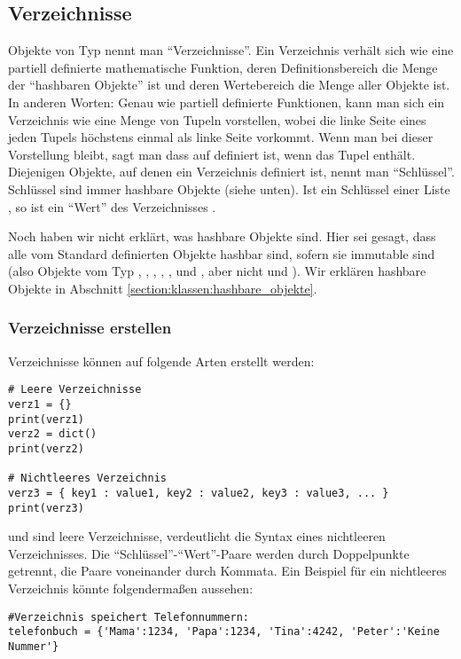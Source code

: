 \subsection{Verzeichnisse}
\label{section:std_data_types:verzeichnisse}
Objekte von Typ  nennt man ``Verzeichnisse''.
Ein Verzeichnis verhält sich wie eine partiell definierte mathematische Funktion,
deren Definitionsbereich die Menge der ``hashbaren Objekte'' ist und deren Wertebereich die Menge aller Objekte ist.
In anderen Worten:
Genau wie partiell definierte Funktionen, kann man sich ein Verzeichnis  wie eine Menge von Tupeln  vorstellen,
wobei die linke Seite eines jeden Tupels höchstens einmal als linke Seite vorkommt.
Wenn man bei dieser Vorstellung bleibt, sagt man dass  auf  definiert ist, wenn  das Tupel  enthält.
Diejenigen Objekte, auf denen ein Verzeichnis definiert ist, nennt man ``Schlüssel''.
Schlüssel sind immer hashbare Objekte (siehe unten).
Ist  ein Schlüssel einer Liste , so ist  ein ``Wert'' des Verzeichnisses .

Noch haben wir nicht erklärt, was hashbare Objekte sind.
Hier sei gesagt, dass alle vom \Python Standard definierten Objekte hashbar sind, sofern sie immutable sind
(also Objekte vom Typ , , , , ,  und ,
aber nicht  und ).
Wir erklären hashbare Objekte in Abschnitt \ref{section:klassen:hashbare_objekte}.


\subsubsection{Verzeichnisse erstellen}
\label{section:std_data_types:verzeichnisse:verzeichnisse_erstellen}
Verzeichnisse können auf folgende Arten erstellt werden:
\begin{lstlisting}
# Leere Verzeichnisse
verz1 = {}
print(verz1)
verz2 = dict()
print(verz2)

# Nichtleeres Verzeichnis
verz3 = { key1 : value1, key2 : value2, key3 : value3, ... }
print(verz3)
\end{lstlisting}
 und  sind leere Verzeichnisse,  verdeutlicht die Syntax eines nichtleeren Verzeichnisses. Die 
``Schlüssel''-``Wert''-Paare werden durch Doppelpunkte getrennt, die Paare voneinander durch Kommata. Ein Beispiel für ein nichtleeres 
Verzeichnis könnte folgendermaßen aussehen:
\begin{lstlisting}
#Verzeichnis speichert Telefonnummern:
telefonbuch = {'Mama':1234, 'Papa':1234, 'Tina':4242, 'Peter':'Keine Nummer'}
\end{lstlisting}

